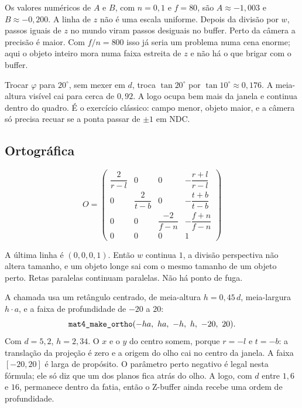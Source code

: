 \documentclass[11pt,a4paper]{article}
\newcommand{\fn}[1]{\texttt{\nobreak\hspace{0pt}#1}}
\begin{document}
Os valores numéricos de \(A\) e \(B\), com \(n = 0{,}1\) e \(f = 80\), são \(A \approx -1{,}003\) e \(B \approx -0{,}200\). A linha de \(z\) não é uma escala uniforme. Depois da divisão por \(w\), passos iguais de \(z\) no mundo viram passos desiguais no buffer. Perto da câmera a precisão é maior. Com \(f/n = 800\) isso já seria um problema numa cena enorme; aqui o objeto inteiro mora numa faixa estreita de \(z\) e não há o que brigar com o buffer.

Trocar \(\varphi\) para \(20^\circ\), sem mexer em \(d\), troca \(\tan 20^\circ\) por \(\tan 10^\circ \approx 0{,}176\). A meia-altura visível cai para cerca de \(0{,}92\). A logo ocupa bem mais da janela e continua dentro do quadro. É o exercício clássico: campo menor, objeto maior, e a câmera só precisa recuar se a ponta passar de \(\pm 1\) em NDC.

\subsection{Ortográfica}

\begin{equation}
O =
\begin{pmatrix}
\dfrac{2}{r-l} & 0 & 0 & -\dfrac{r+l}{r-l} \\[0.7em]
0 & \dfrac{2}{t-b} & 0 & -\dfrac{t+b}{t-b} \\[0.7em]
0 & 0 & \dfrac{-2}{f-n} & -\dfrac{f+n}{f-n} \\[0.7em]
0 & 0 & 0 & 1
\end{pmatrix}
\label{eq:orto}
\end{equation}

A última linha é \((0, 0, 0, 1)\). Então \(w\) continua \(1\), a divisão perspectiva não altera tamanho, e um objeto longe sai com o mesmo tamanho de um objeto perto. Retas paralelas continuam paralelas. Não há ponto de fuga.

A chamada usa um retângulo centrado, de meia-altura \(h = 0{,}45\, d\), meia-largura \(h \cdot a\), e a faixa de profundidade de \(-20\) a \(20\):
\[
  \fn{mat4\_make\_ortho}(-h a,\ h a,\ -h,\ h,\ -20,\ 20).
\]
Com \(d = 5{,}2\), \(h = 2{,}34\). O \(x\) e o \(y\) do centro somem, porque \(r = -l\) e \(t = -b\): a translação da projeção é zero e a origem do olho cai no centro da janela. A faixa \([-20, 20]\) é larga de propósito. O parâmetro perto negativo é legal nesta fórmula; ele só diz que um dos planos fica atrás do olho. A logo, com \(d\) entre \(1{,}6\) e \(16\), permanece dentro da fatia, então o Z-buffer ainda recebe uma ordem de profundidade.
\end{document}
